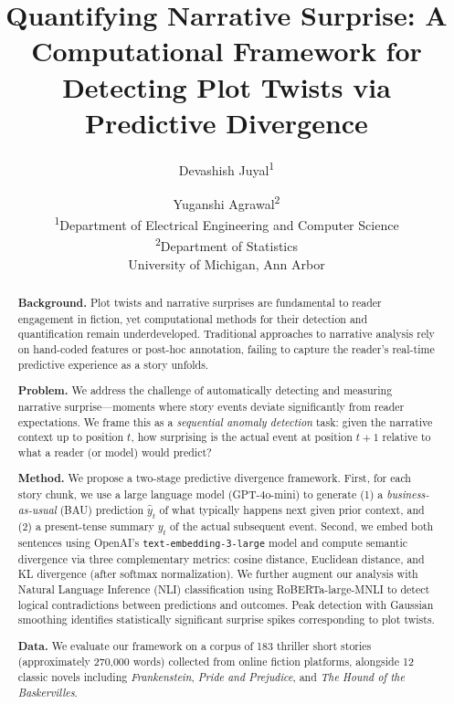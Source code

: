 \documentclass[12pt]{article}
\title{Quantifying Narrative Surprise: A Computational Framework for Detecting Plot Twists via Predictive Divergence}
\author{
    Devashish Juyal\textsuperscript{1} \and Yuganshi Agrawal\textsuperscript{2} \\[0.5em]
    \textsuperscript{1}Department of Electrical Engineering and Computer Science \\
    \textsuperscript{2}Department of Statistics \\
    University of Michigan, Ann Arbor
}
\date{}
\begin{document}
\maketitle

\begin{abstract}
\noindent
\textbf{Background.}
Plot twists and narrative surprises are fundamental to reader engagement in fiction, yet computational methods for their detection and quantification remain underdeveloped. Traditional approaches to narrative analysis rely on hand-coded features or post-hoc annotation, failing to capture the reader's real-time predictive experience as a story unfolds.

\vspace{0.5em}
\noindent
\textbf{Problem.}
We address the challenge of automatically detecting and measuring narrative surprise---moments where story events deviate significantly from reader expectations. We frame this as a \emph{sequential anomaly detection} task: given the narrative context up to position $t$, how surprising is the actual event at position $t+1$ relative to what a reader (or model) would predict?

\vspace{0.5em}
\noindent
\textbf{Method.}
We propose a two-stage predictive divergence framework. First, for each story chunk, we use a large language model (GPT-4o-mini) to generate (1) a \emph{business-as-usual} (BAU) prediction $\hat{y}_t$ of what typically happens next given prior context, and (2) a present-tense summary $y_t$ of the actual subsequent event. Second, we embed both sentences using OpenAI's \texttt{text-embedding-3-large} model and compute semantic divergence via three complementary metrics: cosine distance, Euclidean distance, and KL divergence (after softmax normalization). We further augment our analysis with Natural Language Inference (NLI) classification using RoBERTa-large-MNLI to detect logical contradictions between predictions and outcomes. Peak detection with Gaussian smoothing identifies statistically significant surprise spikes corresponding to plot twists.

\vspace{0.5em}
\noindent
\textbf{Data.}
We evaluate our framework on a corpus of 183 thriller short stories (approximately 270,000 words) collected from online fiction platforms, alongside 12 classic novels including \emph{Frankenstein}, \emph{Pride and Prejudice}, and \emph{The Hound of the Baskervilles}.


\end{abstract}
\end{document}
